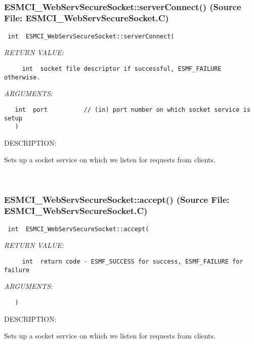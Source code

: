  
\mbox{}\hrulefill\
 
\subsubsection{ESMCI\_WebServSecureSocket::serverConnect() (Source File: ESMCI\_WebServSecureSocket.C)}


  
\begin{verbatim} int  ESMCI_WebServSecureSocket::serverConnect(\end{verbatim}{\em RETURN VALUE:}
\begin{verbatim}     int  socket file descriptor if successful, ESMF_FAILURE otherwise.\end{verbatim}{\em ARGUMENTS:}
\begin{verbatim}   int  port          // (in) port number on which socket service is setup
   )\end{verbatim}
{\sf DESCRIPTION:\\ }


      Sets up a socket service on which we listen for requests from clients.
   
 
\mbox{}\hrulefill\
 
\subsubsection{ESMCI\_WebServSecureSocket::accept() (Source File: ESMCI\_WebServSecureSocket.C)}


  
\begin{verbatim} int  ESMCI_WebServSecureSocket::accept(\end{verbatim}{\em RETURN VALUE:}
\begin{verbatim}     int  return code - ESMF_SUCCESS for success, ESMF_FAILURE for failure\end{verbatim}{\em ARGUMENTS:}
\begin{verbatim}   )\end{verbatim}
{\sf DESCRIPTION:\\ }


      Sets up a socket service on which we listen for requests from clients.
   
 
